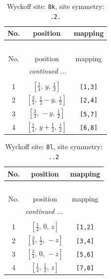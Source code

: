 \documentclass[fleqn,8pt]{jsarticle}
\begin{document}
\renewcommand{\arraystretch}{1.2}
\begin{longtable}{ccc}
\caption{Wyckoff site: {\tt 8k}, site symmetry: {\tt .2.}}
 \\
 \hline \hline
No. & position & mapping \\ \hline \endfirsthead

\multicolumn{2}{l}{\tablename\ \thetable{}} \\
 \hline \hline
No. & position & mapping \\ \hline \endhead

 \hline \hline
\multicolumn{2}{r}{\footnotesize\it continued ...} \\ \endfoot

 \hline \hline
\multicolumn{2}{r}{} \\ \endlastfoot

1 & $\left[ \frac{1}{4},\, y,\, \frac{1}{2} \right]$ & {\tt [1,3]} \\ \hline
2 & $\left[ \frac{3}{4},\, \frac{1}{2} - y,\, \frac{1}{2} \right]$ & {\tt [2,4]} \\ \hline
3 & $\left[ \frac{3}{4},\, - y,\, \frac{1}{2} \right]$ & {\tt [5,7]} \\ \hline
4 & $\left[ \frac{1}{4},\, y + \frac{1}{2},\, \frac{1}{2} \right]$ & {\tt [6,8]} \\
\end{longtable}
\renewcommand{\arraystretch}{1.2}
\begin{longtable}{ccc}
\caption{Wyckoff site: {\tt 8l}, site symmetry: {\tt ..2}}
 \\
 \hline \hline
No. & position & mapping \\ \hline \endfirsthead

\multicolumn{2}{l}{\tablename\ \thetable{}} \\
 \hline \hline
No. & position & mapping \\ \hline \endhead

 \hline \hline
\multicolumn{2}{r}{\footnotesize\it continued ...} \\ \endfoot

 \hline \hline
\multicolumn{2}{r}{} \\ \endlastfoot

1 & $\left[ \frac{1}{4},\, 0,\, z \right]$ & {\tt [1,2]} \\ \hline
2 & $\left[ \frac{3}{4},\, \frac{1}{2},\, - z \right]$ & {\tt [3,4]} \\ \hline
3 & $\left[ \frac{3}{4},\, 0,\, - z \right]$ & {\tt [5,6]} \\ \hline
4 & $\left[ \frac{1}{4},\, \frac{1}{2},\, z \right]$ & {\tt [7,8]} \\
\end{longtable}
\end{document}

